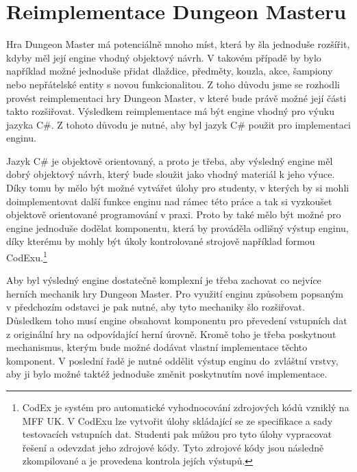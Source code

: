 
\section{Reimplementace Dungeon Masteru}

Hra Dungeon Master má potenciálně mnoho míst, která by šla jednoduše rozšířit, kdyby měl její engine vhodný objektový návrh.
V takovém případě by bylo například možné jednoduše přidat dlaždice, předměty, kouzla, akce, šampiony nebo nepřátelské 
entity s novou funkcionalitou. Z toho důvodu jsme se rozhodli provést reimplementaci hry Dungeon Master, v které bude právě
možné její části takto rozšiřovat. Výsledkem reimplementace má být engine vhodný pro výuku jazyka C\#. Z tohoto důvodu je nutné, 
aby byl jazyk C\# použit pro implementaci enginu.

Jazyk C\# je objektově orientovaný, a proto je třeba, aby výsledný engine měl 
dobrý objektový návrh, který bude sloužit jako vhodný materiál k jeho výuce. 
Díky tomu by mělo být možné vytvářet úlohy pro studenty, v kterých by si mohli doimplementovat další funkce enginu nad rámec této práce
a tak si vyzkoušet objektově orientované programování v praxi. Proto by také mělo být možné
pro engine jednoduše dodělat komponentu, která by prováděla odlišný výstup enginu, díky kterému by mohly být 
úkoly kontrolované strojově například formou CodExu.\footnote{CodEx \cite{CodEx} je systém pro automatické vyhodnocování zdrojových kódů vzniklý na MFF UK.
V CodExu lze vytvořit úlohy skládající se ze specifikace a sady testovacích vstupních dat. Studenti pak	můžou pro tyto úlohy vypracovat 
řešení a odevzdat jeho zdrojové kódy. Tyto zdrojové kódy jsou následně zkompilované a je provedena kontrola jejích výstupů.}

Aby byl výsledný engine dostatečně komplexní je třeba zachovat co nejvíce herních mechanik hry Dungeon Master.
Pro využití enginu způsobem popsaným v předchozím odstavci je pak nutné, aby tyto mechaniky šlo rozšiřovat.
Důsledkem toho musí engine obsahovat komponentu 
pro převedení vstupních dat z originální hry na odpovídající herní úrovně. Kromě toho je třeba poskytnout mechanismus,
kterým bude možné dodávat vlastní implementace těchto komponent. V poslední řadě je nutné oddělit výstup enginu do~zvláštní vrstvy,
aby ji bylo možné taktéž jednoduše změnit poskytnutím nové implementace. 


